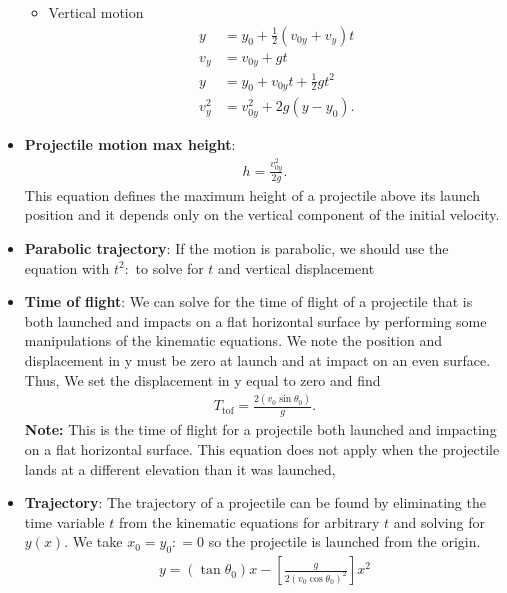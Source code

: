 \documentclass{report}
\begin{document}
\begin{itemize}
\begin{itemize}
                    \item Vertical motion
                        \begin{align*}
                            y &= y_{0} + \frac{1}{2}(v_{0y} + v_{y})t \\
                            v_{y}&= v_{0y} + gt \\
                            y &=y_{0}+v_{0y}t + \frac{1}{2}gt^{2} \\
                            v^{2}_{y} &= v_{0y}^{2}+2g(y-y_{0})
                        .\end{align*}
                \end{itemize}
            \item \textbf{Projectile motion max height}:
                \begin{align*}
                    h = \frac{v_{0y}^{2}}{2g}
                .\end{align*}
                This equation defines the maximum height of a projectile above its launch position and it depends only on the vertical component of the initial velocity.
            \item \textbf{Parabolic trajectory}: If the motion is parabolic, we should use the equation with $t^{2}:$ to solve for $t$ and vertical displacement
            \item \textbf{Time of flight}: We can solve for the time of flight of a projectile that is both launched and impacts on a flat horizontal surface by performing some manipulations of the kinematic equations. We note the position and displacement in y must be zero at launch and at impact on an even surface. Thus, We set the displacement in y equal to zero and find
                \begin{align*}
                    T_{\text{tof}} = \frac{2(v_{0}\sin{\theta_{0}})}{g}
                .\end{align*}
                \textbf{Note:} This is the time of flight for a projectile both launched and impacting on a flat horizontal surface. This equation does not apply when the projectile lands at a different elevation than it was launched,
            \item \textbf{Trajectory}: The trajectory of a projectile can be found by eliminating the time variable $t$ from the kinematic equations for arbitrary $t$ and solving for $y(x)$. We take $x_{0} = y_{0}: = 0$ so the projectile is launched from the origin. 
                \begin{align*}
                    y = (\tan{\theta_{0}})x - \left[\frac{g}{2(v_{0}\cos{\theta_{0}})^{2}}\right]x^{2}

\end{align*}
\end{itemize}
\end{document}
